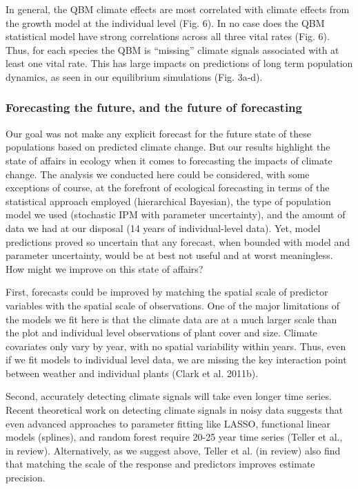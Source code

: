 \documentclass[12pt,]{article}
\begin{document}
In general, the QBM climate effects are most correlated with climate
effects from the growth model at the individual level (Fig. 6). In no
case does the QBM statistical model have strong correlations across all
three vital rates (Fig. 6). Thus, for each species the QBM is
``missing'' climate signals associated with at least one vital rate.
This has large impacts on predictions of long term population dynamics,
as seen in our equilibrium simulations (Fig. 3a-d).

\subsubsection{Forecasting the future, and the future of
forecasting}\label{forecasting-the-future-and-the-future-of-forecasting}

Our goal was not make any explicit forecast for the future state of
these populations based on predicted climate change. But our results
highlight the state of affairs in ecology when it comes to forecasting
the impacts of climate change. The analysis we conducted here could be
considered, with some exceptions of course, at the forefront of
ecological forecasting in terms of the statistical approach employed
(hierarchical Bayesian), the type of population model we used
(stochastic IPM with parameter uncertainty), and the amount of data we
had at our disposal (14 years of individual-level data). Yet, model
predictions proved so uncertain that any forecast, when bounded with
model and parameter uncertainty, would be at best not useful and at
worst meaningless. How might we improve on this state of affairs?

First, forecasts could be improved by matching the spatial scale of
predictor variables with the spatial scale of observations. One of the
major limitations of the models we fit here is that the climate data are
at a much larger scale than the plot and individual level observations
of plant cover and size. Climate covariates only vary by year, with no
spatial variability within years. Thus, even if we fit models to
individual level data, we are missing the key interaction point between
weather and individual plants (Clark et al. 2011b).

Second, accurately detecting climate signals will take even longer time
series. Recent theoretical work on detecting climate signals in noisy
data suggests that even advanced approaches to parameter fitting like
LASSO, functional linear models (splines), and random forest require
20-25 year time series (Teller et al., in review). Alternatively, as we
suggest above, Teller et al. (in review) also find that matching the
scale of the response and predictors improves estimate precision.
\end{document}
